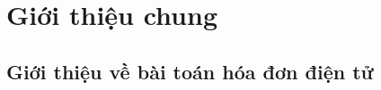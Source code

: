 \documentclass{report} %
\begin{document}
\chapter{Giới thiệu chung}

% 

\section{Giới thiệu về bài toán hóa đơn điện tử}

% 




% 



% 



% 


% 

\end{document}
